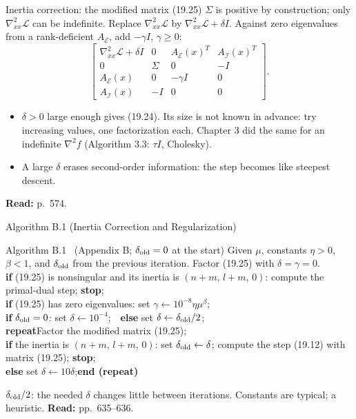 \documentclass[aspectratio=169,12pt]{beamer}
\newcommand{\hessf}{\nabla^{2} f}
\newcommand{\la}{\leftarrow}
\newcommand{\readbook}[1]{{\color{red}\textbf{Read:} #1}}
\newcommand{\cE}{\mathcal{E}}
\newcommand{\cI}{\mathcal{I}}
\newcommand{\cL}{\mathcal{L}}
\newcommand{\hessL}{\nabla_{xx}^{2}\cL}
\newcommand{\Ae}{A_{\cE}}
\newcommand{\Ai}{A_{\cI}}
\begin{document}
\begin{frame}{Inertia correction: the modified matrix (19.25)}
  $\Sigma$ is positive by construction; only $\hessL$ can be indefinite. Replace $\hessL$ by $\hessL+\delta I$.
  Against zero eigenvalues from a rank-deficient $\Ae$, add $-\gamma I$, $\gamma\ge 0$:
  \[ \begin{bmatrix}
       \hessL+\delta I & 0 & \Ae(x)^{T} & \Ai(x)^{T}\\
       0 & \Sigma & 0 & -I\\
       \Ae(x) & 0 & -\gamma I & 0\\
       \Ai(x) & -I & 0 & 0
     \end{bmatrix} . \tag{19.25} \]
  \begin{itemize}\setlength\itemsep{0.3em}
    \item $\delta>0$ large enough gives (19.24). Its size is not known in advance: try increasing values,
      one factorization each. Chapter 3 did the same for an indefinite $\hessf$ (Algorithm 3.3: $\tau I$, Cholesky).
    \item A large $\delta$ erases second-order information: the step becomes like steepest descent.
  \end{itemize}
  \readbook{p.~574.}
\end{frame}

\begin{frame}{Algorithm B.1 (Inertia Correction and Regularization)}
  \begin{block}{Algorithm B.1 \ {\normalfont\small(Appendix B; $\delta_{\rm old}=0$ at the start)}}\small
    Given $\mu$, constants $\eta>0$, $\beta<1$, and $\delta_{\rm old}$ from the previous iteration.
    Factor (19.25) with $\delta=\gamma=0$.\\
    \textbf{if} (19.25) is nonsingular and its inertia is $(n+m,\,l+m,\,0)$:
      compute the primal-dual step; \textbf{stop};\\
    \textbf{if} (19.25) has zero eigenvalues: set $\gamma\la 10^{-8}\eta\mu^{\beta}$;\\
    \textbf{if} $\delta_{\rm old}=0$: set $\delta\la 10^{-4}$;\ \ \textbf{else} set $\delta\la\delta_{\rm old}/2$;\\
    \textbf{repeat}\quad Factor the modified matrix (19.25);\\
    \quad \textbf{if} the inertia is $(n+m,\,l+m,\,0)$: set $\delta_{\rm old}\la\delta$;
      compute the step (19.12) with matrix (19.25); \textbf{stop};\\
    \quad \textbf{else} set $\delta\la 10\delta$;\quad\textbf{end (repeat)}
  \end{block}
  $\delta_{\rm old}/2$: the needed $\delta$ changes little between iterations. Constants are typical; a heuristic.
  \readbook{pp.~635--636.}
\end{frame}
\end{document}
